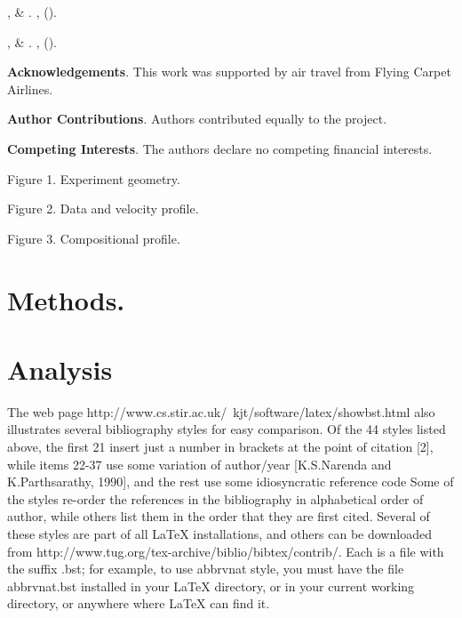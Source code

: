 \documentclass[12pt,a4paper]{article}
\begin{document}
\begin{thebibliography}{10}
,  \&
\newblock {}.
\newblock \emph{}
  \textbf{}, 
  ().

,  \&
\newblock {}.
\newblock \emph{} \textbf{},
   ().

\end{thebibliography}

\bigskip\noindent
{\bf Acknowledgements}.
This work was supported by air travel from Flying Carpet Airlines.

\bigskip\noindent
{\bf Author Contributions}.
Authors contributed equally to the project.

\bigskip\noindent
{\bf Competing Interests}.
The authors declare no competing financial interests.

\bigskip\noindent
Figure 1.
Experiment geometry.
\hfil\break

\bigskip\noindent
Figure 2.
Data and velocity profile.

\bigskip\noindent
Figure 3.
Compositional profile.

\section*{Methods.}
\renewcommand{\thefigure}{S\arabic{figure}}
\setcounter{figure}{0}
\renewcommand{\thetable}{ST\arabic{table}}
\renewcommand{\tablename}{}
\setcounter{table}{0}
\section*{Analysis}

The web page http://www.cs.stir.ac.uk/~kjt/software/latex/showbst.html also
illustrates several bibliography styles for easy comparison.
Of the 44 styles listed above, the first 21 insert just a number in brackets at
the point of citation [2], while items 22-37 use some variation of author/year
[K.S.Narenda and K.Parthsarathy, 1990], and the rest use some idiosyncratic
reference code
\citep{EatonKendall2006,
Kind1979}
Some of the styles re-order the references in the bibliography in alphabetical
order of author, while others list them in the order that they are first cited.
Several of these styles are part of all LaTeX installations, and others can be
downloaded from http://www.tug.org/tex-archive/biblio/bibtex/contrib/.
Each is a file with the suffix .bst; for example, to use abbrvnat style, you
must have the file abbrvnat.bst installed in your LaTeX directory, or in your
current working directory, or anywhere where LaTeX can find it.
\end{document}
